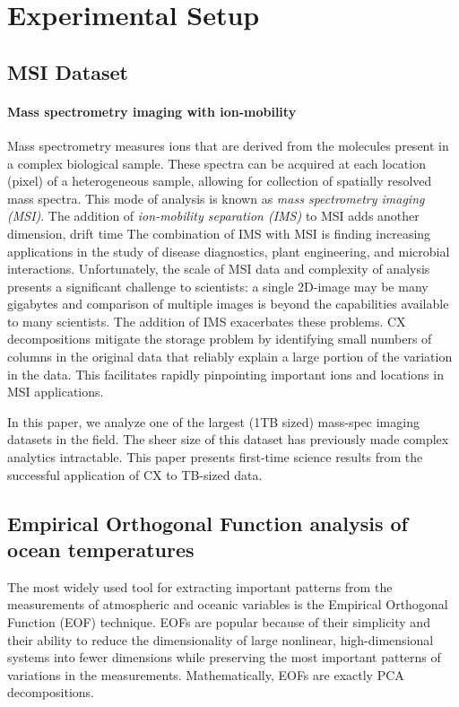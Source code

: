 \section{Experimental Setup}
\label{sec:setup}

\subsection{MSI Dataset}
\paragraph{Mass spectrometry imaging with ion-mobility}
Mass spectrometry measures ions that are derived from the molecules present in a complex biological sample.
These spectra can be acquired at each location (pixel) of a heterogeneous sample, allowing for collection of spatially
resolved mass spectra.
This mode of analysis is known as \textit{mass spectrometry imaging (MSI)}.
The addition of \textit{ion-mobility separation (IMS)} to MSI adds another dimension, drift time
The combination of IMS with MSI is finding increasing applications in the study of disease diagnostics, plant
engineering, and microbial interactions. Unfortunately, the scale of MSI data and complexity of analysis presents a significant challenge to
scientists: a single 2D-image may be many gigabytes and comparison of multiple images is beyond the capabilities
available to many scientists. The addition of IMS exacerbates these problems. CX decompositions mitigate the storage problem by 
identifying small numbers of columns in the original data that
reliably explain a large portion of the variation in the data.  This
facilitates rapidly pinpointing important ions and locations in MSI
applications.

In this paper, we analyze one of the largest (1TB sized) mass-spec imaging
datasets in the field. The sheer size of this dataset has previously made
complex analytics intractable. This paper presents first-time science results
from the successful application of CX to TB-sized data.

\subsection{Empirical Orthogonal Function analysis of ocean temperatures}
The most widely used tool for extracting important patterns from the
measurements of atmospheric and oceanic variables is the Empirical Orthogonal
Function (EOF) technique. EOFs are popular because of their simplicity and
their ability to reduce the dimensionality of large nonlinear, high-dimensional
systems into fewer dimensions while preserving the most important patterns of
variations in the measurements. Mathematically, EOFs are exactly PCA decompositions.

